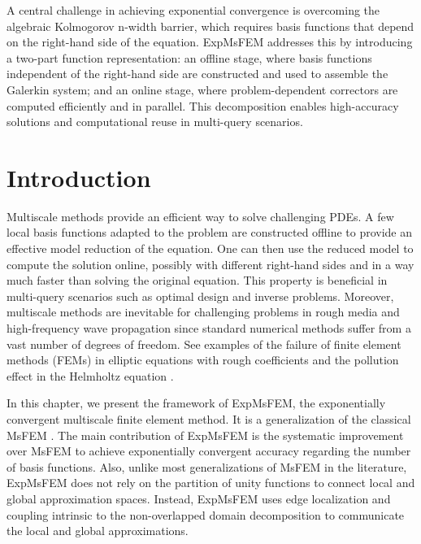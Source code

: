 \documentclass[12pt]{caltech_thesis}
\numberwithin{equation}{section}
\begin{document}
A central challenge in achieving exponential convergence is overcoming the algebraic Kolmogorov 
n-width barrier, which requires basis functions that depend on the right-hand side of the equation. ExpMsFEM addresses this by introducing a two-part function representation: an offline stage, where basis functions independent of the right-hand side are constructed and used to assemble the Galerkin system; and an online stage, where problem-dependent correctors are computed efficiently and in parallel. This decomposition enables high-accuracy solutions and computational reuse in multi-query scenarios.

\section{Introduction}
Multiscale methods provide an efficient way to solve challenging PDEs. A few local basis functions adapted to the problem are constructed offline to provide an effective model reduction of the equation. One can then use the reduced model to compute the solution online, possibly with different right-hand sides and in a way much faster than solving the original equation. This property is beneficial in multi-query scenarios such as optimal design and inverse problems. Moreover, multiscale methods are inevitable for challenging problems in rough media and high-frequency wave propagation since standard numerical methods suffer from a vast number of degrees of freedom. See examples of the failure of finite element methods (FEMs) in elliptic equations with rough coefficients \cite{babuvska2000can} and the pollution effect in the Helmholtz equation \cite{babuska1997pollution}.

In this chapter, we present the framework of ExpMsFEM, the exponentially convergent multiscale finite element method. It is a generalization of the classical MsFEM \cite{hou_multiscale_1997}. The main contribution of ExpMsFEM is the systematic improvement over MsFEM to achieve exponentially convergent accuracy regarding the number of basis functions. Also, unlike most generalizations of MsFEM in the literature, ExpMsFEM does not rely on the partition of unity functions to connect local and global approximation spaces. Instead, ExpMsFEM uses edge localization and coupling intrinsic to the non-overlapped domain decomposition to communicate the local and global approximations.
\end{document}
